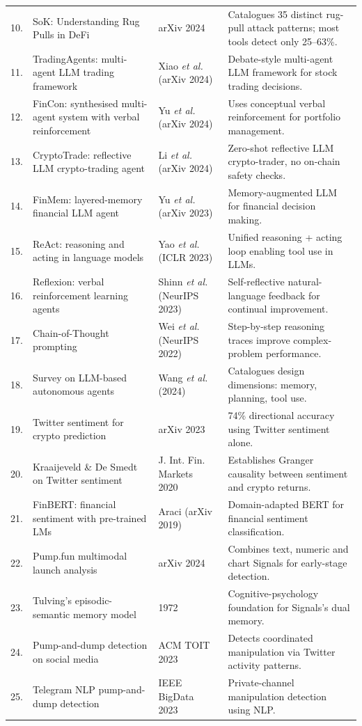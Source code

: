 \documentclass[12pt,a4paper,oneside,openany]{book}
\begin{document}
\begin{small}
\begin{longtable}{@{}p{0.8cm}p{3.8cm}p{3.4cm}p{5.6cm}@{}}
10. & SoK: Understanding Rug Pulls in DeFi & arXiv 2024~\cite{ref20} & Catalogues 35 distinct rug-pull attack patterns; most tools detect only 25--63\%. \\
11. & TradingAgents: multi-agent LLM trading framework & Xiao \textit{et al.} (arXiv 2024)~\cite{ref23} & Debate-style multi-agent LLM framework for stock trading decisions. \\
12. & FinCon: synthesised multi-agent system with verbal reinforcement & Yu \textit{et al.} (arXiv 2024)~\cite{ref24} & Uses conceptual verbal reinforcement for portfolio management. \\
13. & CryptoTrade: reflective LLM crypto-trading agent & Li \textit{et al.} (arXiv 2024)~\cite{ref25} & Zero-shot reflective LLM crypto-trader, no on-chain safety checks. \\
14. & FinMem: layered-memory financial LLM agent & Yu \textit{et al.} (arXiv 2023)~\cite{ref26} & Memory-augmented LLM for financial decision making. \\
15. & ReAct: reasoning and acting in language models & Yao \textit{et al.} (ICLR 2023)~\cite{ref28} & Unified reasoning + acting loop enabling tool use in LLMs. \\
16. & Reflexion: verbal reinforcement learning agents & Shinn \textit{et al.} (NeurIPS 2023)~\cite{ref29} & Self-reflective natural-language feedback for continual improvement. \\
17. & Chain-of-Thought prompting & Wei \textit{et al.} (NeurIPS 2022)~\cite{ref31} & Step-by-step reasoning traces improve complex-problem performance. \\
18. & Survey on LLM-based autonomous agents & Wang \textit{et al.} (2024)~\cite{ref32} & Catalogues design dimensions: memory, planning, tool use. \\
19. & Twitter sentiment for crypto prediction & arXiv 2023~\cite{ref8} & 74\% directional accuracy using Twitter sentiment alone. \\
20. & Kraaijeveld \& De Smedt on Twitter sentiment & J. Int. Fin. Markets 2020~\cite{ref9} & Establishes Granger causality between sentiment and crypto returns. \\
21. & FinBERT: financial sentiment with pre-trained LMs & Araci (arXiv 2019)~\cite{ref40} & Domain-adapted BERT for financial sentiment classification. \\
22. & Pump.fun multimodal launch analysis & arXiv 2024~\cite{ref10} & Combines text, numeric and chart Signals for early-stage detection. \\
23. & Tulving's episodic-semantic memory model & 1972~\cite{ref45} & Cognitive-psychology foundation for Signals's dual memory. \\
24. & Pump-and-dump detection on social media & ACM TOIT 2023~\cite{ref43} & Detects coordinated manipulation via Twitter activity patterns. \\
25. & Telegram NLP pump-and-dump detection & IEEE BigData 2023~\cite{ref44} & Private-channel manipulation detection using NLP. \\
\end{longtable}
\end{small}
\end{document}
